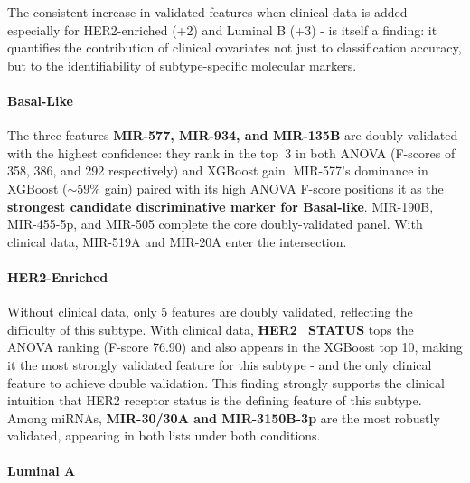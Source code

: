 The consistent increase in validated features when clinical data is added - especially for
HER2-enriched (+2) and Luminal B (+3) - is itself a finding: it quantifies the
contribution of clinical covariates not just to classification accuracy, but to the
identifiability of subtype-specific molecular markers.

\paragraph{Basal-Like}

The three features \textbf{MIR-577, MIR-934, and MIR-135B} are doubly validated with
the highest confidence: they rank in the top~3 in both ANOVA (F-scores of 358, 386, and
292 respectively) and XGBoost gain. MIR-577's dominance in XGBoost ($\sim 59\%$ gain) paired
with its high ANOVA F-score positions it as the \textbf{strongest candidate discriminative
marker for Basal-like}. MIR-190B, MIR-455-5p, and MIR-505 complete the core doubly-validated
panel. With clinical data, MIR-519A and MIR-20A enter the intersection. 

\paragraph{HER2-Enriched}

Without clinical data, only 5 features are doubly validated, reflecting the difficulty of
this subtype. With clinical data, \textbf{HER2\_STATUS} tops the ANOVA ranking (F-score 76.90)
and also appears in the XGBoost top 10, making it the most strongly validated feature for
this subtype - and the only clinical feature to achieve double validation. This finding
strongly supports the clinical intuition that HER2 receptor status is the defining feature of
this subtype. Among miRNAs, \textbf{MIR-30/30A and MIR-3150B-3p} are the most robustly
validated, appearing in both lists under both conditions.

\paragraph{Luminal A}

